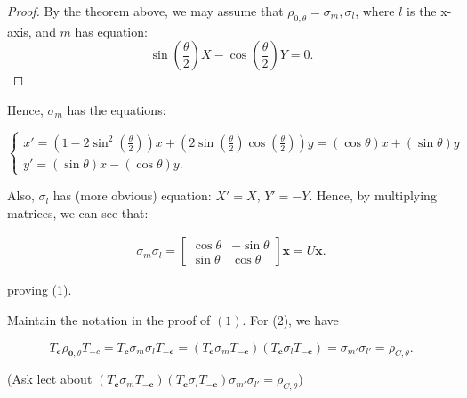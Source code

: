 \begin{proof}
  By the theorem above, we may assume that \( \rho_{0,\theta} = \sigma_{m}, \sigma_{l} \), where
  \( l \) is the x-axis, and \( m \) has equation:
  \[
    \sin \left( \frac{\theta}{2} \right)X - \cos \left( \frac{\theta}{2} \right)Y = 0
  .\] 
\end{proof}
Hence, \( \sigma_{m} \) has the equations:

\begin{equation*}
    \begin{cases}
      x' = \left(1 - 2 \sin^2(\frac{\theta}{2})  \right)x + \left(2\sin \left(\frac{\theta}{2}  \right) \cos \left(\frac{\theta}{2}  \right)  \right)y= \left( \cos \theta  \right) x + \left( \sin \theta  \right)y \\
      y' = \left( \sin \theta  \right)x - \left( \cos \theta  \right)y.
    \end{cases}
\end{equation*}

Also, \( \sigma_{l} \) has (more obvious) equation: \( X' = X \), \( Y' = -Y\).
Hence, by multiplying matrices, we can see that:

\begin{align*}
  \sigma_{m}\sigma_{l} = \begin{bmatrix} \cos \theta & - \sin \theta \\ \sin \theta & \cos \theta  \end{bmatrix} \mathbf{x} = U \mathbf{x}
.\end{align*}

proving (1).

Maintain the notation in the proof of \( \left(1  \right) \).
For (2), we have

\[
  T_{\mathbf{c}}\rho_{\mathbf{0},\theta }T_{-c} = T_{\mathbf{c}}\sigma_{m} \sigma_{l} T_{-\mathbf{c}} 
  = \left( T_{\mathbf{c}}\sigma_{m}T_{-\mathbf{c}} \right) \left( T_{\mathbf{c}}\sigma_{l}T_{-\mathbf{c}} \right)
  = \sigma_{m'}\sigma_{l'} = \rho_{C, \theta}
.\] 

(Ask lect about \(\left( T_{\mathbf{c}}\sigma_{m}T_{-\mathbf{c}} \right) \left( T_{\mathbf{c}}\sigma_{l}T_{-\mathbf{c}} \right)
   \sigma_{m'}\sigma_{l'} = \rho_{C, \theta}\))





